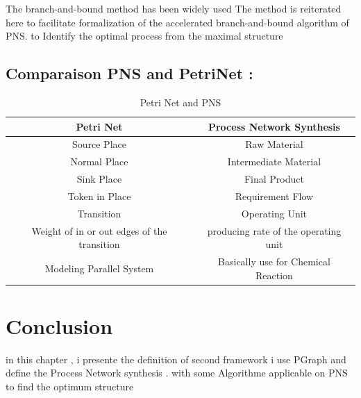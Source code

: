 The branch-and-bound method has been widely used The method is reiterated here to facilitate formalization of the
accelerated branch-and-bound algorithm of PNS.
to Identify the optimal process from the maximal structure 


\subsection{ Comparaison PNS and PetriNet : }
\begin {table}[H] 
\begin{tabular}{cc}

\hline 
\textbf{Petri Net}  & \textbf{Process Network Synthesis}\tabularnewline
\hline 
Source Place  & Raw Material\tabularnewline
Normal Place  & Intermediate Material\tabularnewline
Sink Place  & Final Product\tabularnewline
Token in Place  & Requirement Flow \tabularnewline
Transition  & Operating Unit \tabularnewline
Weight of in or out edges of the  transition & producing rate of the operating unit\tabularnewline
\hline 
Modeling Parallel System  & Basically use for Chemical Reaction \tabularnewline
\hline 

\end{tabular}
\caption {Petri Net and PNS}
 
\end {table}

\section{Conclusion}
in this chapter , i presente the definition of second framework i use
PGraph and define the Process Network synthesis .
with some Algorithme applicable on PNS
to find the optimum structure